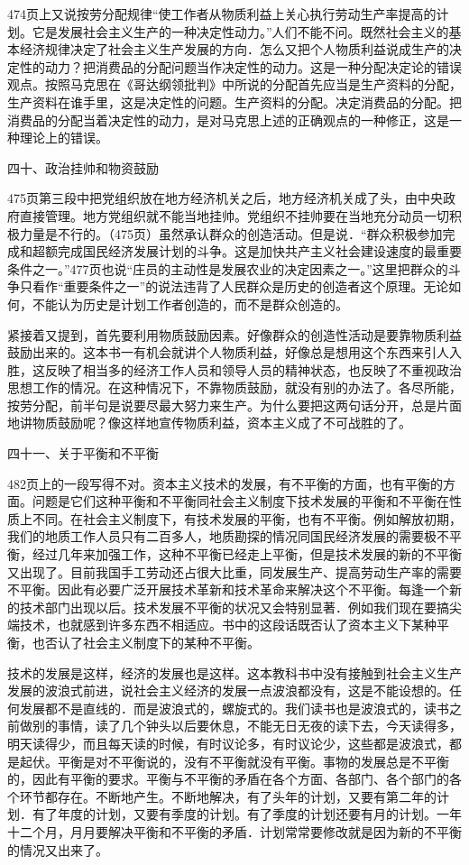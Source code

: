 474页上又说按劳分配规律“使工作者从物质利益上关心执行劳动生产率提高的计划。它是发展社会主义生产的一种决定性动力。”人们不能不问。既然社会主义的基本经济规律决定了社会主义生产发展的方向．怎么又把个人物质利益说成生产的决定性的动力？把消费品的分配问题当作决定性的动力。这是一种分配决定论的错误观点。按照马克思在《哥达纲领批判》中所说的分配首先应当是生产资料的分配，生产资料在谁手里，这是决定性的问题。生产资料的分配。决定消费品的分配。把消费品的分配当着决定性的动力，是对马克思上述的正确观点的一种修正，这是一种理论上的错误。

四十、政治挂帅和物资鼓励

475页第三段中把党组织放在地方经济机关之后，地方经济机关成了头，由中央政府直接管理。地方党组织就不能当地挂帅。党组织不挂帅要在当地充分动员一切积极力量是不行的。（475页）虽然承认群众的创造活动。但是说．“群众积极参加完成和超额完成国民经济发展计划的斗争。这是加快共产主义社会建设速度的最重要条件之一。”477页也说“庄员的主动性是发展农业的决定因素之一。”这里把群众的斗争只看作“重要条件之一”的说法违背了人民群众是历史的创造者这个原理。无论如何，不能认为历史是计划工作者创造的，而不是群众创造的。

紧接着又提到，首先要利用物质鼓励因素。好像群众的创造性活动是要靠物质利益鼓励出来的。这本书一有机会就讲个人物质利益，好像总是想用这个东西来引人入胜，这反映了相当多的经济工作人员和领导人员的精神状态，也反映了不重视政治思想工作的情况。在这种情况下，不靠物质鼓励，就没有别的办法了。各尽所能，按劳分配，前半句是说要尽最大努力来生产。为什么要把这两句话分开，总是片面地讲物质鼓励呢？像这样地宣传物质利益，资本主义成了不可战胜的了。

四十一、关于平衡和不平衡

482页上的一段写得不对。资本主义技术的发展，有不平衡的方面，也有平衡的方面。问题是它们这种平衡和不平衡同社会主义制度下技术发展的平衡和不平衡在性质上不同。在社会主义制度下，有技术发展的平衡，也有不平衡。例如解放初期，我们的地质工作人员只有二百多人，地质勘探的情况同国民经济发展的需要极不平衡，经过几年来加强工作，这种不平衡已经走上平衡，但是技术发展的新的不平衡又出现了。目前我国手工劳动还占很大比重，同发展生产、提高劳动生产率的需要不平衡。因此有必要广泛开展技术革新和技术革命来解决这个不平衡。每逢一个新的技术部门出现以后。技术发展不平衡的状况又会特别显著．例如我们现在要搞尖端技术，也就感到许多东西不相适应。书中的这段话既否认了资本主义下某种平衡，也否认了社会主义制度下的某种不平衡。

技术的发展是这样，经济的发展也是这样。这本教科书中没有接触到社会主义生产发展的波浪式前进，说社会主义经济的发展一点波浪都没有，这是不能设想的。任何发展都不是直线的．而是波浪式的，螺旋式的。我们读书也是波浪式的，读书之前做别的事情，读了几个钟头以后要休息，不能无日无夜的读下去，今天读得多，明天读得少，而且每天读的时候，有时议论多，有时议论少，这些都是波浪式，都是起伏。平衡是对不平衡说的，没有不平衡就没有平衡。事物的发展总是不平衡的，因此有平衡的要求。平衡与不平衡的矛盾在各个方面、各部门、各个部门的各个环节都存在。不断地产生。不断地解决，有了头年的计划，又要有第二年的计划．有了年度的计划，又要有季度的计划。有了季度的计划还要有月的计划。一年十二个月，月月要解决平衡和不平衡的矛盾．计划常常要修改就是因为新的不平衡的情况又出来了。

